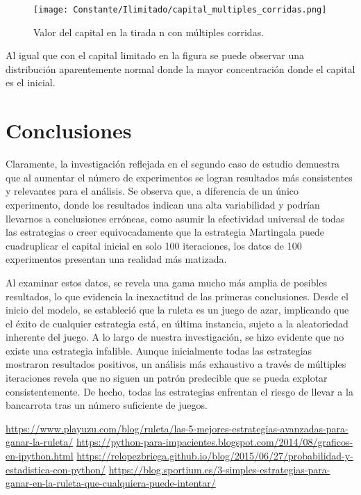 \documentclass{article}
\begin{document}
    \begin{figure} [H]
        \centering
         \texttt{[image: Constante/Ilimitado/capital\_multiples\_corridas.png]}
            \caption{Valor del capital en la tirada n con múltiples corridas.}
            \label{fig:grafico}
    \end{figure}

Al igual que con el capital limitado en la figura se puede observar una distribución aparentemente normal donde la mayor concentración donde el capital es el inicial.

\section{Conclusiones}

Claramente, la investigación reflejada en el segundo caso de estudio demuestra que al aumentar el número de experimentos se logran resultados más consistentes y relevantes para el análisis. Se observa que, a diferencia de un único experimento, donde los resultados indican una alta variabilidad y podrían llevarnos a conclusiones erróneas, como asumir la efectividad universal de todas las estrategias o creer equivocadamente que la estrategia Martingala puede cuadruplicar el capital inicial en solo 100 iteraciones, los datos de 100 experimentos presentan una realidad más matizada.

Al examinar estos datos, se revela una gama mucho más amplia de posibles resultados, lo que evidencia la inexactitud de las primeras conclusiones. Desde el inicio del modelo, se estableció que la ruleta es un juego de azar, implicando que el éxito de cualquier estrategia está, en última instancia, sujeto a la aleatoriedad inherente del juego. A lo largo de nuestra investigación, se hizo evidente que no existe una estrategia infalible. Aunque inicialmente todas las estrategias mostraron resultados positivos, un análisis más exhaustivo a través de múltiples iteraciones revela que no siguen un patrón predecible que se pueda explotar consistentemente. De hecho, todas las estrategias enfrentan el riesgo de llevar a la bancarrota tras un número suficiente de juegos.

  

\begin{thebibliography}{1}
     \url{https://www.playuzu.com/blog/ruleta/las-5-mejores-estrategias-avanzadas-para-ganar-la-ruleta/}
     \url{https://python-para-impacientes.blogspot.com/2014/08/graficos-en-ipython.html}
     \url{https://relopezbriega.github.io/blog/2015/06/27/probabilidad-y-estadistica-con-python/}
     \url{https://blog.sportium.es/3-simples-estrategias-para-ganar-en-la-ruleta-que-cualquiera-puede-intentar/}
\end{thebibliography}
\end{document}
